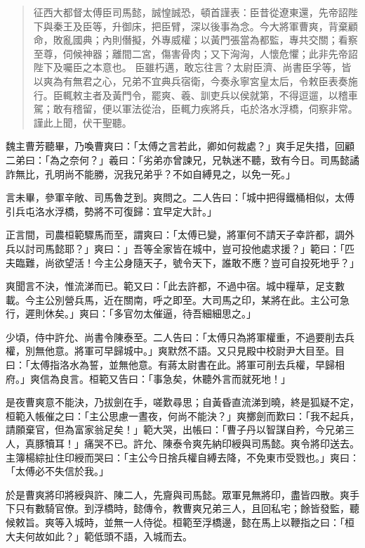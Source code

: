 \begin{quote}
征西大都督太傅臣司馬懿，誠惶誠恐，頓首謹表：臣昔從遼東還，先帝詔陛下與秦王及臣等，升御床，把臣臂，深以後事為念。今大將軍曹爽，背棄顧命，敗亂國典；內則僭擬，外專威權；以黃門張當為都監，專共交關；看察至尊，伺候神器；離間二宮，傷害骨肉；又下洶洶，人懷危懼；此非先帝詔陛下及囑臣之本意也。
臣雖朽邁，敢忘往言？太尉臣濟、尚書臣孚等，皆以爽為有無君之心，兄弟不宜典兵宿衛，今奏永寧宮皇太后，令敕臣表奏施行。臣輒敕主者及黃門令，罷爽、羲、訓吏兵以侯就第，不得逗遛，以稽車駕；敢有稽留，便以軍法從治，臣輒力疾將兵，屯於洛水浮橋，伺察非常。謹此上聞，伏干聖聽。
\end{quote}

魏主曹芳聽畢，乃喚曹爽曰：「太傅之言若此，卿如何裁處？」爽手足失措，回顧二弟曰：「為之奈何？」羲曰：「劣弟亦曾諫兄，兄執迷不聽，致有今日。司馬懿譎詐無比，孔明尚不能勝，況我兄弟乎？不如自縛見之，以免一死。」

言未畢，參軍辛敞、司馬魯芝到。爽問之。二人告曰：「城中把得鐵桶相似，太傅引兵屯洛水浮橋，勢將不可復歸：宜早定大計。」

正言間，司農桓範驟馬而至，謂爽曰：「太傅已變，將軍何不請天子幸許都，調外兵以討司馬懿耶？」爽曰：」吾等全家皆在城中，豈可投他處求援？」範曰：「匹夫臨難，尚欲望活！今主公身隨天子，號令天下，誰敢不應？豈可自投死地乎？」

爽聞言不決，惟流涕而已。範又曰：「此去許都，不過中宿。城中糧草，足支數載。今主公別營兵馬，近在關南，呼之即至。大司馬之印，某將在此。主公可急行，遲則休矣。」爽曰：「多官勿太催逼，待吾細細思之。」

少頃，侍中許允、尚書令陳泰至。二人告曰：「太傅只為將軍權重，不過要削去兵權，別無他意。將軍可早歸城中。」爽默然不語。又只見殿中校尉尹大目至。目曰：「太傅指洛水為誓，並無他意。有蔣太尉書在此。將軍可削去兵權，早歸相府。」爽信為良言。桓範又告曰：「事急矣，休聽外言而就死地！」

是夜曹爽意不能決，乃拔劍在手，嗟歎尋思；自黃昏直流涕到曉，終是狐疑不定，桓範入帳催之曰：「主公思慮一晝夜，何尚不能決？」爽擲劍而歎曰：「我不起兵，請願棄官，但為富家翁足矣！」範大哭，出帳曰：「曹子丹以智謀自矜，今兄弟三人，真豚犢耳！」痛哭不已。許允、陳泰令爽先納印綬與司馬懿。爽令將印送去。主簿楊綜扯住印綬而哭曰：「主公今日捨兵權自縛去降，不免東市受戮也。」爽曰：「太傅必不失信於我。」

於是曹爽將印將綬與許、陳二人，先齎與司馬懿。眾軍見無將印，盡皆四散。爽手下只有數騎官僚。到浮橋時，懿傳令，教曹爽兄弟三人，且回私宅；餘皆發監，聽候敕旨。爽等入城時，並無一人侍從。桓範至浮橋邊，懿在馬上以鞭指之曰：「桓大夫何故如此？」範低頭不語，入城而去。

